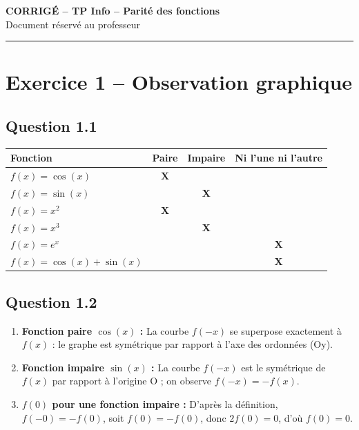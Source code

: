 \documentclass[12pt,a4paper]{article}
\begin{document}
\thispagestyle{fancy}

\begin{center}
    {\LARGE \textbf{CORRIGÉ -- TP Info -- Parité des fonctions}}\\[6pt]
    {\large\color{corrframe} Document réservé au professeur}
\end{center}

\hrule\medskip

\section*{Exercice 1 -- Observation graphique}

\subsection*{Question 1.1}

\renewcommand{\arraystretch}{1.8}
\begin{center}
\begin{tabular}{|l|c|c|c|}
    \hline
    \textbf{Fonction} & \textbf{Paire} & \textbf{Impaire} & \textbf{Ni l'une ni l'autre} \\
    \hline
    $f(x) = \cos(x)$           & \textbf{X} & & \\
    \hline
    $f(x) = \sin(x)$           & & \textbf{X} & \\
    \hline
    $f(x) = x^2$               & \textbf{X} & & \\
    \hline
    $f(x) = x^3$               & & \textbf{X} & \\
    \hline
    $f(x) = e^x$               & & & \textbf{X} \\
    \hline
    $f(x) = \cos(x) + \sin(x)$ & & & \textbf{X} \\
    \hline
\end{tabular}
\end{center}

\subsection*{Question 1.2}

\begin{repbox}
\begin{enumerate}[label=\alph*)]
    \item \textbf{Fonction paire $\cos(x)$ :} La courbe $f(-x)$ se superpose exactement à $f(x)$ : le graphe est symétrique par rapport à l'axe des ordonnées (Oy).

    \item \textbf{Fonction impaire $\sin(x)$ :} La courbe $f(-x)$ est le symétrique de $f(x)$ par rapport à l'origine O ; on observe $f(-x) = -f(x)$.

    \item \textbf{$f(0)$ pour une fonction impaire :} D'après la définition, $f(-0) = -f(0)$, soit $f(0) = -f(0)$, donc $2f(0) = 0$, d'où $\boxed{f(0) = 0}$.
\end{enumerate}
\end{repbox}
\end{document}
